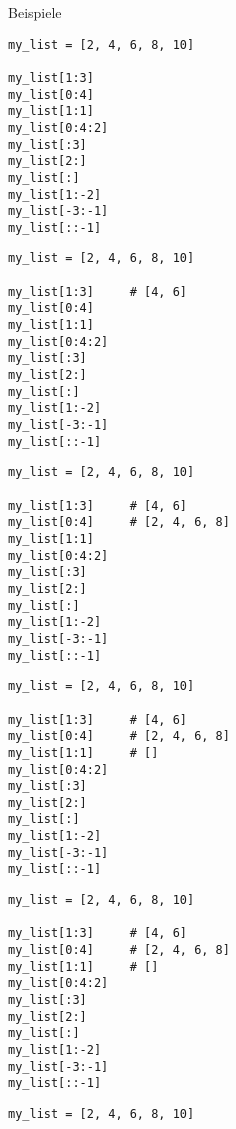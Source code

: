 \begin{fragile}
\begin{exampleblock}{Beispiele}
	\vspace{2pt}
\begin{overprint}
\begin{verbatim}
my_list = [2, 4, 6, 8, 10]

my_list[1:3]    
my_list[0:4]     
my_list[1:1]     
my_list[0:4:2]   
my_list[:3]      
my_list[2:]      
my_list[:]      
my_list[1:-2]    
my_list[-3:-1]  
my_list[::-1]    
\end{verbatim}

\begin{verbatim}
my_list = [2, 4, 6, 8, 10]

my_list[1:3]     # [4, 6]
my_list[0:4]     
my_list[1:1]     
my_list[0:4:2]   
my_list[:3]      
my_list[2:]     
my_list[:]       
my_list[1:-2]   
my_list[-3:-1]  
my_list[::-1]    
\end{verbatim}

\begin{verbatim}
my_list = [2, 4, 6, 8, 10]

my_list[1:3]     # [4, 6]
my_list[0:4]     # [2, 4, 6, 8]
my_list[1:1]     
my_list[0:4:2]   
my_list[:3]      
my_list[2:]      
my_list[:]       
my_list[1:-2]    
my_list[-3:-1]  
my_list[::-1]    
\end{verbatim}

\begin{verbatim}
my_list = [2, 4, 6, 8, 10]

my_list[1:3]     # [4, 6]
my_list[0:4]     # [2, 4, 6, 8]
my_list[1:1]     # []
my_list[0:4:2]   
my_list[:3]      
my_list[2:]     
my_list[:]       
my_list[1:-2]    
my_list[-3:-1]   
my_list[::-1]    
\end{verbatim}


\begin{verbatim}
my_list = [2, 4, 6, 8, 10]

my_list[1:3]     # [4, 6]
my_list[0:4]     # [2, 4, 6, 8]
my_list[1:1]     # []
my_list[0:4:2]   
my_list[:3]      
my_list[2:]      
my_list[:]       
my_list[1:-2]    
my_list[-3:-1]   
my_list[::-1]    
\end{verbatim}

\begin{verbatim}
my_list = [2, 4, 6, 8, 10]


\end{verbatim}
\end{overprint}
\end{exampleblock}
\end{fragile}
